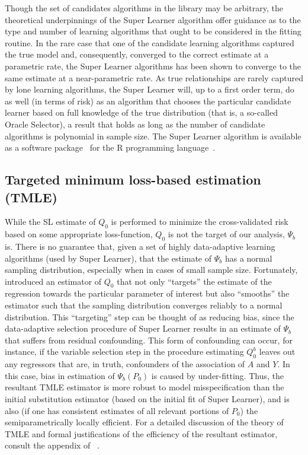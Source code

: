 Though the set of candidates algorithms in the library may be arbitrary, the
theoretical underpinnings of the Super Learner algorithm offer guidance as to
the type and number of learning algorithms that ought to be considered in the
fitting routine. In the rare case that one of the candidate learning algorithms
captured the true model and, consequently, converged to the correct estimate at
a parametric rate, the Super Learner algorithms has been shown to converge to
the same estimate at a near-parametric rate. As true relationships are rarely
captured by lone learning algorithms, the Super Learner will, up to a first
order term, do as well (in terms of risk) as an algorithm that chooses the
particular candidate learner based on full knowledge of the true distribution
(that is, a so-called Oracle Selector), a result that holds as long as the
number of candidate algorithms is polynomial in sample size. The Super Learner
algorithm is available as a software package~\cite{van2007super} for the R
programming language~\cite{R}.

\subsection{Targeted minimum loss-based estimation (TMLE)}\label{tmle}

While the SL estimate of $Q_0$ is performed to minimize the cross-validated
risk based on some appropriate loss-function, $Q_0$ is not the target of our
analysis, $\Psi_b$ is. There is no guarantee that, given a set of highly
data-adaptive learning algorithms (used by Super Learner), that the estimate of
$\Psi_b$ has a normal sampling distribution, especially when in cases of small
sample size. Fortunately,~\cite{van2011targeted} introduced an estimator of
$Q_0$ that not only ``targets'' the estimate of the regression towards the
particular parameter of interest but also ``smooths'' the estimator such that
the sampling distribution converges reliably to a normal distribution. This
``targeting'' step can be thought of as reducing bias, since the data-adaptive
selection procedure of Super Learner results in an estimate of $\Psi_b$ that
suffers from residual confounding. This form of confounding can occur, for
instance, if the variable selection step in the procedure estimating $Q^b_0$
leaves out any regressors that are, in truth, confounders of the association of
$A$ and $Y$. In this case, bias in estimation of $\Psi_b(P_0)$ is caused by
under-fitting. Thus, the resultant TMLE estimator is more robust to model
misspecification than the initial substitution estimator (based on the initial
fit of Super Learner), and is also (if one has consistent estimates of all
relevant portions of $P_0$) the semiparametrically locally efficient. For a
detailed discussion of the theory of TMLE and formal justifications of the
efficiency of the resultant estimator, consult the appendix of
~\cite{van2011targeted}.

